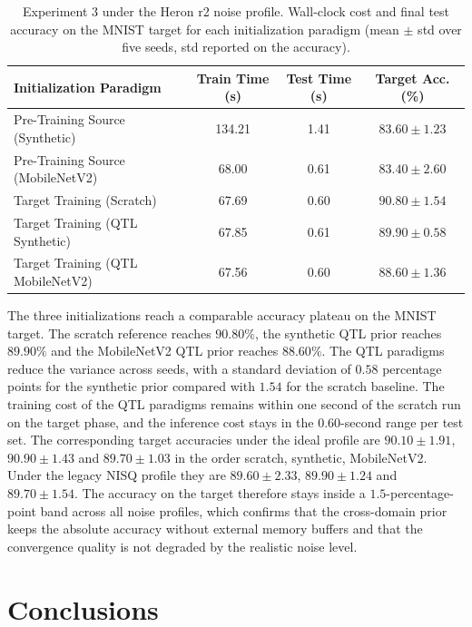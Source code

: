 \documentclass[conference]{IEEEtran}
\begin{document}
\begin{table}[ht]
\centering
\caption{Experiment 3 under the Heron r2 noise profile. Wall-clock cost and final test accuracy on the MNIST target for each initialization paradigm (mean $\pm$ std over five seeds, std reported on the accuracy).}
\label{tab:exp3}
\begin{tabular}{lccc}
\toprule
Initialization Paradigm & Train Time (s) & Test Time (s) & Target Acc. (\%) \\
\midrule
Pre-Training Source (Synthetic)     & 134.21 & 1.41 & $83.60 \pm 1.23$ \\
Pre-Training Source (MobileNetV2)   &  68.00 & 0.61 & $83.40 \pm 2.60$ \\
Target Training (Scratch)           &  67.69 & 0.60 & $90.80 \pm 1.54$ \\
Target Training (QTL Synthetic)     &  67.85 & 0.61 & $89.90 \pm 0.58$ \\
Target Training (QTL MobileNetV2)   &  67.56 & 0.60 & $88.60 \pm 1.36$ \\
\bottomrule
\end{tabular}
\end{table}

The three initializations reach a comparable accuracy plateau on the MNIST target. The scratch reference reaches $90.80\%$, the synthetic QTL prior reaches $89.90\%$ and the MobileNetV2 QTL prior reaches $88.60\%$. The QTL paradigms reduce the variance across seeds, with a standard deviation of $0.58$ percentage points for the synthetic prior compared with $1.54$ for the scratch baseline. The training cost of the QTL paradigms remains within one second of the scratch run on the target phase, and the inference cost stays in the $0.60$-second range per test set. The corresponding target accuracies under the ideal profile are $90.10 \pm 1.91$, $90.90 \pm 1.43$ and $89.70 \pm 1.03$ in the order scratch, synthetic, MobileNetV2. Under the legacy NISQ profile they are $89.60 \pm 2.33$, $89.90 \pm 1.24$ and $89.70 \pm 1.54$. The accuracy on the target therefore stays inside a $1.5$-percentage-point band across all noise profiles, which confirms that the cross-domain prior keeps the absolute accuracy without external memory buffers and that the convergence quality is not degraded by the realistic noise level.

\section{Conclusions}\label{sec:conclusions}
\end{document}
